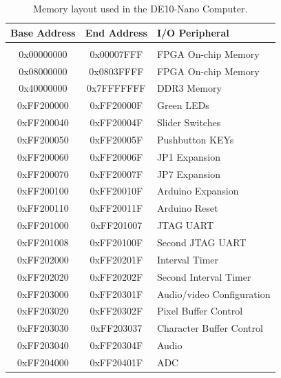 \documentclass[11pt, twoside, pdftex]{article}
\newcommand{\systemName}{DE10-Nano Computer}
\begin{document}
\begin{table}[h]
    \begin{center}
    \begin{tabular}{c|c|l}
            \textbf{Base Address}
            & \textbf{End Address}
            & \textbf{I/O Peripheral}
				\\\hline\vspace{-3mm}\\
            0x00000000
            & 0x00007FFF
            & FPGA On-chip Memory
        \\
            0x08000000
            & 0x0803FFFF
            & FPGA On-chip Memory
        \\
            0x40000000
            & 0x7FFFFFFF
            & DDR3 Memory
        \\
            0xFF200000
            & 0xFF20000F
            & Green LEDs
        \\
            0xFF200040
            & 0xFF20004F
            & Slider Switches
        \\
            0xFF200050
            & 0xFF20005F
            & Pushbutton KEYs
        \\
            0xFF200060
            & 0xFF20006F
            & JP1 Expansion
        \\
            0xFF200070
            & 0xFF20007F
            & JP7 Expansion
        \\
            0xFF200100
            & 0xFF20010F
            & Arduino Expansion
        \\
            0xFF200110
            & 0xFF20011F
            & Arduino Reset
        \\
            0xFF201000
            & 0xFF201007
            & JTAG UART
        \\
            0xFF201008
            & 0xFF20100F
            & Second JTAG UART
        \\
            0xFF202000
            & 0xFF20201F
            & Interval Timer
        \\
            0xFF202020
            & 0xFF20202F
            & Second Interval Timer
				\\
						0xFF203000
						& 0xFF20301F
						& Audio/video Configuration
				\\
						0xFF203020
						& 0xFF20302F
						& Pixel Buffer Control
				\\
						0xFF203030
						& 0xFF203037
						& Character Buffer Control
				\\ 
						0xFF203040
						& 0xFF20304F
						& Audio
        \\
            0xFF204000
            & 0xFF20401F
            & ADC
        \\
    \end{tabular}
    \caption{Memory layout used in the \systemName.}
    \label{tab:memorylayout}
    \end{center}
\end{table}
\end{document}
